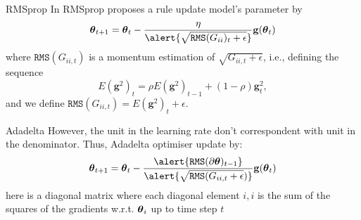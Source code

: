\documentclass[xcolor=pdftex,dvipsnames,table,mathserif]{beamer}
\begin{document}
\begin{frame}{RMSprop \cite{hinton2012neural}}
In RMSprop \cite{hinton2012neural} proposes a rule update model's parameter by
\begin{equation}
\param_{t+1}= \param_{t}- \frac{\eta}{\alert{\sqrt { \texttt{RMS}(G_{ii})_{t}+\epsilon  }}} \mathbf{g}(\param_{t})
\end{equation}
where  $\texttt{RMS}(G_{ii,t})$ is a momentum estimation of $\sqrt { G_{ii,t}+\epsilon}$, i.e., 
defining the sequence 
\begin{equation*}
E(\mathbf{g}^2)_{t}=\rho E(\mathbf{g}^2)_{t-1} + (1-\rho) \mathbf{g}^2_t,
\end{equation*}
and we define $\texttt{RMS}(G_{ii,t})=E(\mathbf{g}^2)_{t}+\epsilon$.
\end{frame}

	
\begin{frame}{Adadelta \cite{zeiler2012adadelta}}
However, the unit in the learning rate don't correspondent with unit in the denominator. Thus, Adadelta optimiser \cite{zeiler2012adadelta} update by:
\begin{equation}
\param_{t+1}= \param_{t}- \frac{\alert{ \texttt{RMS}(\partial\param)_{t-1}}}{\alert{\sqrt { \texttt{RMS}(G_{ii,t}+\epsilon})}} \mathbf{g}(\param_{t})
\end{equation}
here is a diagonal matrix where each diagonal element $i,i$ is the sum of the squares of the gradients w.r.t. $\boldsymbol{\theta}_i$ up to time step  $t$
\end{frame}
\end{document}

